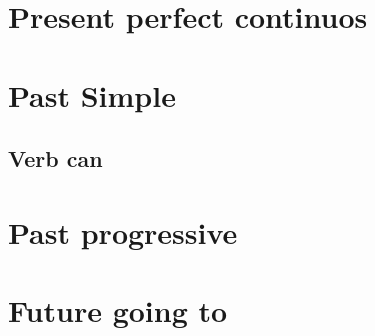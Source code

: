 \documentclass[12pt,openany]{book}
\begin{document}
	\section{Present perfect continuos}

	\section{Past Simple}

		\subsection{Verb can}

	\section{Past progressive}

	\section{Future going to}
\end{document}
